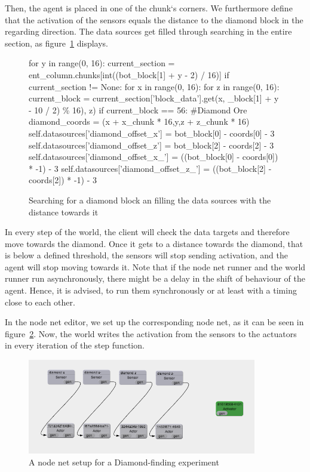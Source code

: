 Then, the agent is placed in one of the chunk`s corners. We furthermore define that the activation of the sensors equals the distance to the diamond block in the regarding direction. The data sources get filled through searching in the entire section, as figure~\ref{listing_sensors} displays.

		\begin{figure}[ht]
			\centering
			\begin{minipage}{18cm}
				\begin{pseudocode}
for y in range(0, 16):
 current_section = ent_column.chunks[int((bot_block[1] + y -  2) / 16)]
 if current_section != None:
  for x in range(0, 16):
   for z in range(0, 16):
    current_block = current_section['block_data'].get(x, _block[1] + y - 10 / 2) \% 16), z)
    if current_block == 56: #Diamond Ore
     diamond_coords = (x + x_chunk * 16,y,z + z_chunk * 16)
      self.datasources['diamond_offset_x'] = bot_block[0] - coords[0] - 3
      self.datasources['diamond_offset_z'] = bot_block[2] - coords[2] - 3
      self.datasources['diamond_offset_x_'] = ((bot_block[0] - coords[0]) * -1) - 3
      self.datasources['diamond_offset_z_'] = ((bot_block[2] - coords[2]) * -1) - 3
			\end{pseudocode}
		\caption{Searching for a diamond block an filling the data sources with the distance towards it}
		\label{listing_sensors}
	\end{minipage}
\end{figure}
    
In every step of the world, the client will check the data targets and therefore move towards the diamond. Once it gets to a distance towards the diamond, that is below a defined threshold, the sensors will stop sending activation, and the agent will stop moving towards it. Note that if the node net runner and the world runner run asynchronously, there might be a delay in the shift of behaviour of the agent. Hence, it is advised, to run them synchronously or at least with a timing close to each other.

In the node net editor, we set up the corresponding node net, as it can be seen in figure~\ref{nodenet_setup}. Now, the world writes the activation from the sensors to the actuators in every iteration of the step function.

\begin{figure}[h]
  \centering
    \includegraphics[width=10cm]{graphics/nodenet_setup}
  \caption{A node net setup for a Diamond-finding experiment}
  \label{nodenet_setup}
\end{figure}

